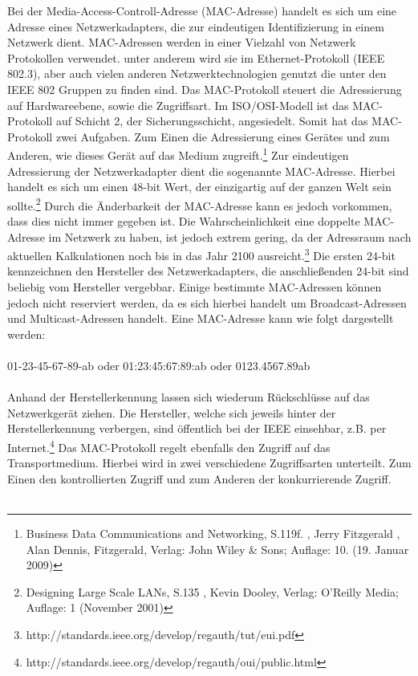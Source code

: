 Bei der Media-Access-Controll-Adresse (MAC-Adresse) handelt es sich um eine Adresse eines Netzwerkadapters, die zur eindeutigen Identifizierung in einem Netzwerk dient.
MAC-Adressen werden in einer Vielzahl von Netzwerk Protokollen verwendet.
unter anderem wird sie im Ethernet-Protokoll (IEEE 802.3), aber auch vielen anderen Netzwerktechnologien genutzt die unter den IEEE 802 Gruppen zu finden sind.
Das MAC-Protokoll steuert die Adressierung auf Hardwareebene, sowie die Zugriffsart.
Im ISO/OSI-Modell ist das MAC-Protokoll auf Schicht 2, der Sicherungsschicht, angesiedelt.
Somit hat das MAC-Protokoll zwei Aufgaben.
Zum Einen die Adressierung eines Gerätes und zum Anderen, wie dieses Gerät auf das Medium zugreift.\footnote{Business Data Communications and Networking, S.119f. , Jerry Fitzgerald , Alan Dennis, Fitzgerald, Verlag: John Wiley \& Sons; Auflage: 10. (19. Januar 2009)}
Zur eindeutigen Adressierung der Netzwerkadapter  dient die sogenannte MAC-Adresse. Hierbei handelt es sich um einen 48-bit Wert, der einzigartig auf der ganzen Welt sein sollte.\footnote{Designing Large Scale LANs, S.135 , Kevin Dooley, Verlag: O'Reilly Media; Auflage: 1 (November 2001)} Durch die Änderbarkeit der MAC-Adresse kann es jedoch vorkommen, dass dies nicht immer gegeben ist.
Die Wahrscheinlichkeit eine doppelte MAC-Adresse im Netzwerk zu haben, ist jedoch extrem gering, da der Adressraum nach aktuellen Kalkulationen noch bis in das Jahr 2100 ausreicht.\footnote{http://standards.ieee.org/develop/regauth/tut/eui.pdf} Die ersten 24-bit kennzeichnen den Hersteller des Netzwerkadapters, die anschließenden 24-bit sind beliebig vom Hersteller vergebbar.
Einige bestimmte MAC-Adressen können jedoch nicht reserviert werden, da es sich hierbei handelt um Broadcast-Adressen und Multicast-Adressen handelt.
Eine MAC-Adresse kann wie folgt dargestellt werden:\\
\\
01-23-45-67-89-ab oder 01:23:45:67:89:ab oder 0123.4567.89ab\\
\\
Anhand der Herstellerkennung lassen sich wiederum Rückschlüsse auf das Netzwerkgerät ziehen.
Die Hersteller, welche sich jeweils hinter der Herstellerkennung verbergen, sind öffentlich bei der IEEE einsehbar, z.B. per Internet.\footnote{http://standards.ieee.org/develop/regauth/oui/public.html}
Das MAC-Protokoll regelt ebenfalls den Zugriff auf das Transportmedium. Hierbei wird in zwei verschiedene Zugriffsarten unterteilt. Zum Einen den kontrollierten Zugriff und zum Anderen der konkurrierende Zugriff.\\\\
